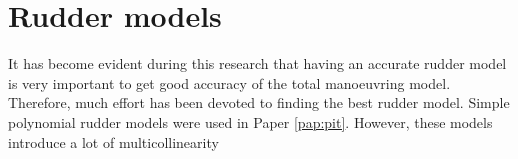 \section{Rudder models} \label{sec:rudders}
It has become evident during this research that having an accurate rudder model is very important to get good accuracy of the total manoeuvring model. Therefore, much effort has been devoted to finding the best rudder model. Simple polynomial rudder models were used in Paper \ref{pap:pit}. However, these models introduce a lot of multicollinearity 



